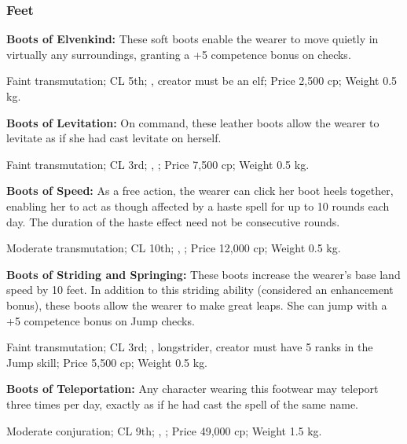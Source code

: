 \subsubsection{Feet}

\textbf{Boots of Elvenkind:} These soft boots enable the wearer to move quietly in virtually any surroundings, granting a +5 competence bonus on  checks.

Faint transmutation; CL 5th; , creator must be an elf; Price 2,500 cp; Weight 0.5 kg.

\textbf{Boots of Levitation:} On command, these leather boots allow the wearer to levitate as if she had cast levitate on herself.

Faint transmutation; CL 3rd; , ; Price 7,500 cp; Weight 0.5 kg.

\textbf{Boots of Speed:} As a free action, the wearer can click her boot heels together, enabling her to act as though affected by a haste spell for up to 10 rounds each day. The duration of the haste effect need not be consecutive rounds.

Moderate transmutation; CL 10th; , ; Price 12,000 cp; Weight 0.5 kg.

\textbf{Boots of Striding and Springing:} These boots increase the wearer's base land speed by 10 feet. In addition to this striding ability (considered an enhancement bonus), these boots allow the wearer to make great leaps. She can jump with a +5 competence bonus on Jump checks.

Faint transmutation; CL 3rd; , longstrider, creator must have 5 ranks in the Jump skill; Price 5,500 cp; Weight 0.5 kg.

\textbf{Boots of Teleportation:} Any character wearing this footwear may teleport three times per day, exactly as if he had cast the spell of the same name.

Moderate conjuration; CL 9th; , ; Price 49,000 cp; Weight 1.5 kg.



